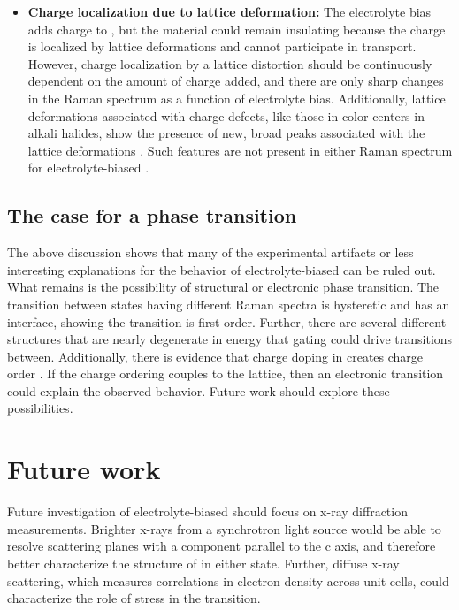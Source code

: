 \begin{itemize}
\item \textbf{Charge localization due to lattice deformation:} The electrolyte bias adds charge to \ruclnospace , but the material could remain insulating because the charge is localized by lattice deformations and cannot participate in transport. However, charge localization by a lattice distortion should be continuously dependent on the amount of charge added, and there are only sharp changes in the Raman spectrum as a function of electrolyte bias. Additionally, lattice deformations associated with charge defects, like those in color centers in alkali halides, show the presence of new, broad peaks associated with the lattice deformations \cite{Porto2006,Benedek1967,Moller1972}. Such features are not present in either Raman spectrum for electrolyte-biased \ruclnospace .
\end{itemize}

\subsection{The case for a phase transition}

The above discussion shows that many of the experimental artifacts or less interesting explanations for the behavior of electrolyte-biased \rucl can be ruled out. What remains is the possibility of structural or electronic phase transition. The transition between states having different Raman spectra is hysteretic and has an interface, showing the transition is first order. Further, there are several different \rucl structures that are nearly degenerate in energy \cite{Kim2016} that gating could drive transitions between. Additionally, there is evidence that charge doping in \rucl creates charge order \cite{Koitzsch2017}. If the charge ordering couples to the lattice, then an electronic transition could explain the observed behavior. Future work should explore these possibilities.

\section{Future work}

Future investigation of electrolyte-biased \rucl should focus on x-ray diffraction measurements. Brighter x-rays from a synchrotron light source would be able to resolve scattering planes with a component parallel to the c axis, and therefore better characterize the structure of \rucl in either state. Further, diffuse x-ray scattering, which measures correlations in electron density across unit cells, could characterize the role of stress in the transition.

